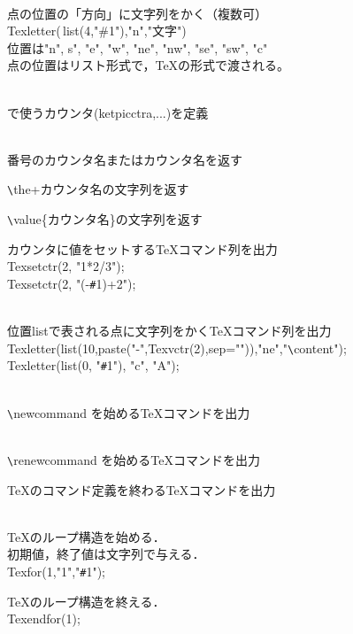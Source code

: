 \documentclass[papersize,a4paper,10pt,uplatex]{jsarticle}
\begin{document}
\\
\tab{}点の位置の「方向」に文字列をかく（複数可）\\
\rei Texletter(\,list(4,"\#1"),"n","文字")\\
\chuu 位置は"n", s", "e", "w", "ne", "nw", "se", "sw", "c"\\
\chuu 点の位置はリスト形式で，\TeX の形式で渡される。

\\
\tab{}\ketpic で使うカウンタ(ketpicctra,...)を定義

\\
\tab{}番号のカウンタ名またはカウンタ名を返す

 \verb|\|the+カウンタ名の文字列を返す

 \verb|\|value\{カウンタ名\}の文字列を返す

カウンタに値をセットする\TeX コマンド列を出力\\
\rei Texsetctr(2, "1*2/3");\\
\rei Texsetctr(2, "(-\verb|#|1)+2");

\\
\tab{}位置listで表される点に文字列をかく\TeX コマンド列を出力\\
\rei Texletter(list(10,paste("-",Texvctr(2),sep="")),"ne","\verb|\|content");\\
\rei Texletter(list(0, "\verb|#|1"), "c", "A");

\\
\tab{}\verb|\|newcommand を始める\TeX コマンドを出力

\\
\tab{}\verb|\|renewcommand を始める\TeX コマンドを出力

\TeX のコマンド定義を終わる\TeX コマンドを出力

\\
\tab{}\TeX のループ構造を始める．\\
\chuu   初期値，終了値は文字列で与える．\\
\rei Texfor(1,"1","\verb|#|1");

\TeX のループ構造を終える．\\
\rei Texendfor(1);
\end{document}
